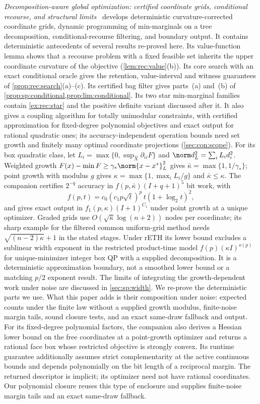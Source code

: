\emph{Decomposition-aware global optimization: certified coordinate grids,
conditional recourse, and structural limits}~\citep{companion-decomposition-aware}
develops deterministic curvature-corrected coordinate grids, dynamic
programming of min-marginals on a tree decomposition, conditional-recourse
filtering, and boundary output. It contains deterministic antecedents of
several results re-proved here. Its value-function lemma shows that a
recourse problem with a fixed feasible set inherits the upper coordinate
curvature of the objective (\cref{lem:rec:value}(b)). Its core search with
an exact conditional oracle gives the retention, value-interval and witness
guarantees of \cref{prop:rec:search}(a)--(c). Its certified bag filter gives
parts~(a) and~(b) of \cref{prop:sp:conditional,prop:lim:conditional}.
Its two star min-marginal families contain \cref{ex:rec:star} and the
positive definite variant discussed after it. It also gives a coupling algorithm for totally unimodular constraints, with
certified approximation for fixed-degree polynomial objectives and exact
output for rational quadratic ones; its accuracy-independent operation
bounds need set growth and finitely many optimal coordinate projections
(\cref{sec:con:scope}). For its box quadratic
class, let $L_i=\max\{0,\sup_{\widehat X}\partial_{ii}F\}$ and
$\norm d_L^2=\sum_iL_id_i^2$. Weighted growth
$F(x)-\min F\ge\gamma_*\norm{x-x^*}_L^2$ gives
$\bar\kappa=\max\{1,1/\gamma_*\}$; point growth with modulus $g$ gives
$\kappa=\max\{1,\max_iL_i/g\}$ and $\bar\kappa\le\kappa$. The companion
certifies $2^{-q}$ accuracy in $f(p,\bar\kappa)(I+q+1)^5$ bit work, with
\[
 f(p,t)=c_0(c_1p\sqrt t)^p\,t(1+\log_2t)^2,
\]
and gives exact output in $f_1(p,\kappa)(I+1)^{C_1}$ under point growth at
a unique optimizer. Graded grids use
$O(\sqrt{\bar\kappa}\log(n+2))$ nodes per coordinate; its sharp example
for the filtered common uniform-grid method needs
$\sqrt{(n-2)\kappa}+1$ in the stated stages. Under rETH its lower bound
excludes a sublinear width exponent in the restricted product-time model
$f(p)(\kappa I)^{o(p)}$ for unique-minimizer integer box QP with a supplied
decomposition. It is a
deterministic approximation boundary, not a smoothed lower bound or a
matching $p/2$ exponent result. The limits of integrating the
growth-dependent work under noise are discussed in \cref{sec:sp:width}.
We re-prove the deterministic parts we use. What this paper adds is their
composition under noise: expected counts under the finite law without a
supplied growth modulus, finite-noise margin tails, sound closure tests, and
an exact same-draw fallback and output.
For its fixed-degree polynomial factors, the companion also derives
a Hessian lower bound on the free coordinates at a point-growth optimizer
and returns a rational face box whose restricted objective is strongly
convex. Its runtime guarantee additionally assumes strict complementarity
at the active continuous bounds and depends polynomially on the bit length
of a reciprocal margin. The returned descriptor is implicit; its optimizer
need not have rational coordinates. Our polynomial closure reuses this
type of enclosure and supplies finite-noise margin tails and an exact
same-draw fallback.


